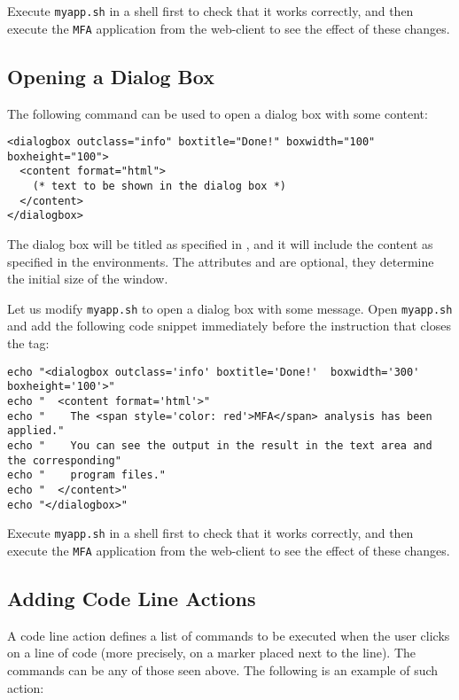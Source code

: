 \medskip
\noindent
Execute \texttt{myapp.sh} in a shell first to check that it works
correctly, and then execute the \texttt{MFA} application from the
web-client to see the effect of these changes.


\subsection{Opening a Dialog Box}

The following command can be used to open a dialog box with some
content:

\medskip
\begin{lstlisting}
<dialogbox outclass="info" boxtitle="Done!" boxwidth="100" boxheight="100"> 
  <content format="html">
    (* text to be shown in the dialog box *)
  </content>
</dialogbox>
\end{lstlisting}

\medskip 
\noindent 
The dialog box will be titled as specified in , and it
will include the content as specified in the 
environments. The attributes  and  are
optional, they determine the initial size of the window.

Let us modify \texttt{myapp.sh} to open a dialog box with some
message. Open \texttt{myapp.sh} and add the following code snippet
immediately before the instruction that closes the 
tag:

\medskip
\begin{lstlisting}[style=script]
echo "<dialogbox outclass='info' boxtitle='Done!'  boxwidth='300' boxheight='100'>"
echo "  <content format='html'>"
echo "    The <span style='color: red'>MFA</span> analysis has been applied."
echo "    You can see the output in the result in the text area and the corresponding"
echo "    program files."
echo "  </content>"
echo "</dialogbox>"
\end{lstlisting}

\medskip
\noindent
Execute \texttt{myapp.sh} in a shell first to check that it works
correctly, and then execute the \texttt{MFA} application from the
web-client to see the effect of these changes.


\subsection{Adding Code Line Actions}

A code line action defines a list of commands to be executed when the
user clicks on a line of code (more precisely, on a marker placed next
to the line). The commands can be any of those seen above. The
following is an example of such action:

